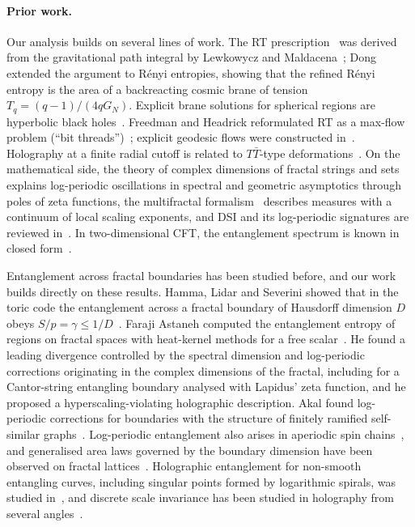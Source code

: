 \documentclass[11pt]{article}
\theoremstyle{definition}\newtheorem{definition}{Definition}[section]
\theoremstyle{remark}\newtheorem*{remark}{Remark}
\newcommand{\GN}{G_N}
\begin{document}
\paragraph{Prior work.}
Our analysis builds on several lines of work. The RT prescription~\cite{RT} was derived from the
gravitational path integral by Lewkowycz and Maldacena~\cite{LM}; Dong~\cite{Dong} extended the argument to
R\'enyi entropies, showing that the refined R\'enyi entropy is the area of a backreacting cosmic brane of
tension $T_q=(q-1)/(4q\GN)$. Explicit brane solutions for spherical regions are hyperbolic black
holes~\cite{HMSY}. Freedman and Headrick reformulated RT as a max-flow problem (``bit threads'')~\cite{FH};
explicit geodesic flows were constructed in~\cite{ABP}. Holography at a finite radial cutoff is related to
$T\bar T$-type deformations~\cite{MMV,HKST}. On the mathematical side, the theory of complex dimensions of
fractal strings and sets~\cite{LvF,LRZ} explains log-periodic oscillations in spectral and geometric
asymptotics through poles of zeta functions, the multifractal formalism~\cite{Halsey} describes measures with
a continuum of local scaling exponents, and DSI and its log-periodic signatures are reviewed in~\cite{Sornette}.
In two-dimensional CFT, the entanglement spectrum is known in closed form~\cite{CL,CT}.

Entanglement across fractal boundaries has been studied before, and our work builds directly on these
results. Hamma, Lidar and Severini showed that in the toric code the entanglement across a fractal boundary
of Hausdorff dimension $D$ obeys $S/p=\gamma\le1/D$~\cite{Hamma}. Faraji Astaneh computed the entanglement
entropy of regions on fractal spaces with heat-kernel methods for a free scalar~\cite{FarajiAstaneh}. He
found a leading divergence controlled by the spectral dimension and log-periodic corrections originating in
the complex dimensions of the fractal, including for a Cantor-string entangling boundary analysed with
Lapidus' zeta function, and he proposed a hyperscaling-violating holographic description. Akal found
log-periodic corrections for boundaries with the structure of finitely ramified self-similar
graphs~\cite{Akal}. Log-periodic entanglement also arises in aperiodic spin chains~\cite{IJZ,JZ}, and
generalised area laws governed by the boundary dimension have been observed on fractal
lattices~\cite{Hamma,FractalLattices}. Holographic entanglement for non-smooth entangling curves, including
singular points formed by logarithmic spirals, was studied in~\cite{HirataTakayanagi,MyersSingh,BMWK,Pastras},
and discrete scale invariance has been studied in holography from several angles~\cite{DSIholo,BDF,padic}.
\end{document}
